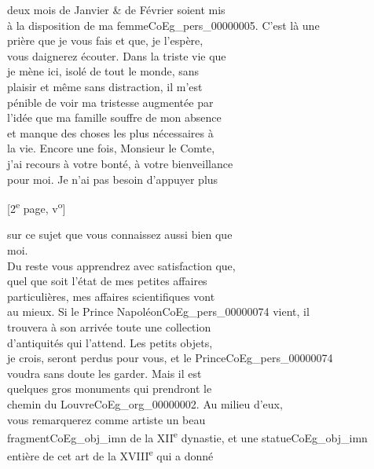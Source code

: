 \documentclass{book}
\begin{document}
{deux mois de Janvier \& de Février soient mis\\
à la disposition de ma femme\gls{CoEg_pers_00000005}. C’est là une\\
prière que je vous fais et que, je l’espère,\\
vous daignerez écouter. Dans la triste vie que\\
je mène ici, isolé de tout le monde, sans\\
plaisir et même sans distraction, il m’est\\
pénible de voir ma tristesse augmentée par\\
l’idée que ma famille souffre de mon absence\\
et manque des choses les plus nécessaires à\\
la vie. Encore une fois, Monsieur le Comte,\\
j’ai recours à votre bonté, à votre bienveillance\\
pour moi. Je n’ai pas besoin d’appuyer plus
{\footnotesize \begin{center} [2\textsuperscript{e} page, v\textsuperscript{o}]\end{center}}
\noindent sur ce sujet que vous connaissez aussi bien que\\
moi.\\
\indent Du reste vous apprendrez avec satisfaction que,\\
quel que soit l’état de mes petites affaires\\
particulières, mes affaires scientifiques vont\\
au mieux. Si le Prince Napoléon\gls{CoEg_pers_00000074} vient, il\\
trouvera à son arrivée toute une collection\\
d’antiquités qui l’attend. Les petits objets,\\
je crois, seront perdus pour vous, et le Prince\gls{CoEg_pers_00000074}\\
voudra sans doute les garder. Mais il est\\
quelques gros monuments qui prendront le\\
chemin du Louvre\gls{CoEg_org_00000002}. Au milieu d’eux,\\
vous remarquerez comme artiste un beau\\
fragment\gls{CoEg_obj_imn} de la XII\textsuperscript{e} dynastie, et une statue\gls{CoEg_obj_imn}\\
entière de cet art de la XVIII\textsuperscript{e} qui a donné\\
}
\end{document}
